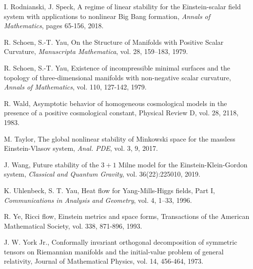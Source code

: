 \documentclass{amsart}
\begin{document}
\begin{thebibliography}{}
 I. Rodnianski, J. Speck, A regime of linear stability for the Einstein-scalar field system with applications to nonlinear Big Bang formation, \textit{Annals of Mathematics}, pages 65-156, 2018.  

 R. Schoen, S.-T. Yau, On the Structure of Manifolds with Positive Scalar Curvature, \textit{Manuscripta Mathematica}, vol. 28, 159–183, 1979.  

 R. Schoen, S.-T. Yau, Existence of incompressible minimal surfaces and the topology of three-dimensional manifolds with non-negative scalar curvature, \textit{Annals of Mathematics}, vol. 110, 127-142, 1979.  

 R. Wald, Asymptotic behavior of homogeneous cosmological models in the presence of a positive cosmological constant, Physical Review D, vol. 28, 2118, 1983.  



 M. Taylor, The global nonlinear stability of Minkowski space for the massless Einstein-Vlasov system, \textit{Anal. PDE}, vol. 3, 9, 2017.  

 J. Wang, Future stability of the $3+1$ Milne model for the Einstein-Klein-Gordon system, \textit{Classical and Quantum Gravity}, vol. 36(22):225010, 2019.  

 K. Uhlenbeck, S. T. Yau, Heat flow for Yang-Mills-Higgs fields, Part I, \textit{Communications in Analysis and Geometry}, vol. 4, 1–33, 1996.


 R. Ye, Ricci flow, Einstein metrics and space forms, Transactions of the American Mathematical Society, vol. 338, 871-896, 1993.   

 J. W. York Jr., Conformally invariant orthogonal decomposition of symmetric tensors on Riemannian manifolds and the initial-value problem of general relativity, Journal of Mathematical Physics, vol. 14, 456-464, 1973.



\end{thebibliography}
\end{document}
